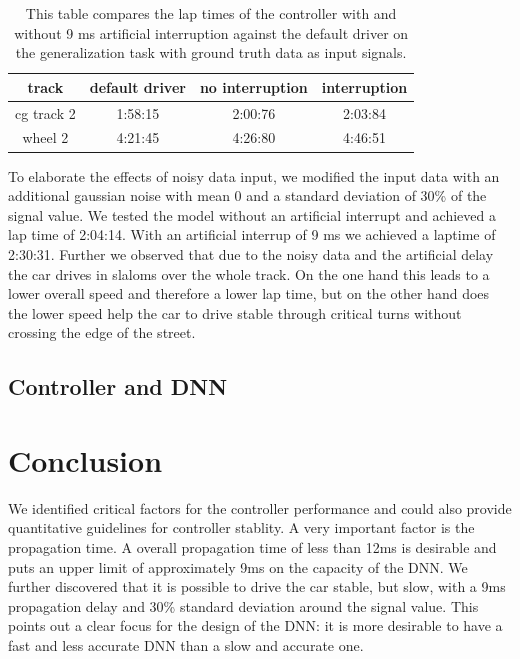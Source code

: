 \documentclass[10pt,a4paper,twoside,journal]{IEEEtran}
\begin{document}
\begin{table}[ht]
	\begin{center}
		\begin{tabular}{ |c|c|c|c| } 
			\hline
			track &  default driver & no interruption & interruption \\
			\hline
			cg track 2  & 1:58:15 & 2:00:76 & 2:03:84  \\
			wheel 2 & 4:21:45 & 4:26:80 & 4:46:51 \\
			\hline
		\end{tabular}
		\caption{\label{tab:controller_laptime}This table compares the lap times of the controller with and without 9 ms artificial interruption against the default driver on the generalization task with ground truth data as input signals.}
	\end{center}
\end{table}
To elaborate the effects of noisy data input, we modified the input data with an additional gaussian noise with mean 0 and a standard deviation of 30\% of the signal value. We tested the model without an artificial interrupt and achieved a lap time of 2:04:14. With an artificial interrup of 9 ms we achieved a laptime of 2:30:31. Further we observed that due to the noisy data and the artificial delay the car drives in slaloms over the whole track. On the one hand this leads to a lower overall speed and therefore a lower lap time, but on the other hand does the lower speed help the car to drive stable through critical turns without crossing the edge of the street.

\subsection{Controller and DNN}



\section{Conclusion}
\label{sc:conclusion}
We identified critical factors for the controller performance and could also provide quantitative guidelines for controller stablity. A very important factor is the propagation time. A overall propagation time of less than 12ms is desirable and puts an upper limit of approximately 9ms on the capacity of the DNN. We further discovered that it is possible to drive the car stable, but slow, with a 9ms propagation delay and 30\% standard deviation around the signal value. This points out a clear focus for the design of the DNN: it is more desirable to have a fast and less accurate DNN than a slow and accurate one. \\
\end{document}
